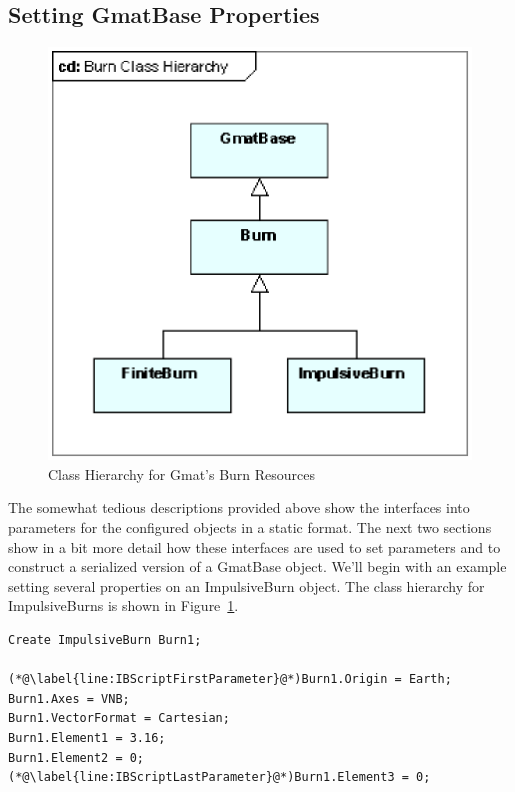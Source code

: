 \subsection{Setting GmatBase Properties}

\begin{figure}[htb]
\begin{center}
\includegraphics[scale=0.5]{Images/BurnClassHierarchy.eps}
\caption{\label{figure:BurnClassOverview}Class Hierarchy for Gmat's Burn Resources}
\end{center}
\end{figure}

The somewhat tedious descriptions provided above show the interfaces into parameters for the
configured objects in a static format.  The next two sections show in a bit more detail how these
interfaces are used to set parameters and to construct a serialized version of a GmatBase object. 
We'll begin with an example setting several properties on an ImpulsiveBurn object.  The class
hierarchy for ImpulsiveBurns is shown in Figure~\ref{figure:BurnClassOverview}.

\begin{lstlisting}[caption={Script Listing for an ImpulsiveBurn},
label={listing:ImpulsiveBurn}]
Create ImpulsiveBurn Burn1;

(*@\label{line:IBScriptFirstParameter}@*)Burn1.Origin = Earth;
Burn1.Axes = VNB;
Burn1.VectorFormat = Cartesian;
Burn1.Element1 = 3.16;
Burn1.Element2 = 0;
(*@\label{line:IBScriptLastParameter}@*)Burn1.Element3 = 0;
\end{lstlisting}
\lstset{numbers=none}

